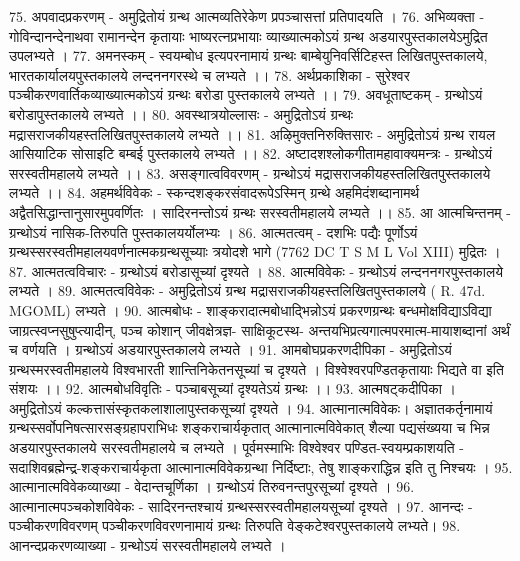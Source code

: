 75. अपवादप्रकरणम् - अमुद्रितोयं ग्रन्थ आत्मव्यतिरेकेण प्रपञ्चासत्तां प्रतिपादयति । 
76. अभिव्यक्ता - गोविन्दानन्देनाथवा रामानन्देन कृतायाः भाष्यरत्नप्रभायाः व्याख्यात्मकोऽयं ग्रन्थ अडयारपुस्तकालयेऽमुद्रित उपलभ्यते । 
77. अमनस्कम् - स्वयम्बोध इत्यपरनामायं ग्रन्थः बाम्बेयुनिवर्सिटिहस्त लिखितपुस्तकालये, भारतकार्यालयपुस्तकालये लन्दननगरस्थे च लभ्यते ।। 
78. अर्थप्रकाशिका - सुरेश्वर पञ्चीकरणवार्तिकव्याख्यात्मकोऽयं ग्रन्थः बरोडा पुस्तकालये लभ्यते ।। 
79. अवधूताष्टकम् - ग्रन्थोऽयं बरोडापुस्तकालये लभ्यते ।। 
80. अवस्थात्रयोल्लासः - अमुद्रितोऽयं ग्रन्थः मद्रासराजकीयहस्तलिखितपुस्तकालये लभ्यते ।। 
81. अऴिमुक्तनिरुक्तिसारः - अमुद्रितोऽयं ग्रन्थ रायल आसियाटिक सोसाइटि बम्बई पुस्तकालये लभ्यते ।। 
82. अष्टादशश्लोकगीतामहावाक्यमन्त्रः - ग्रन्थोऽयं सरस्वतीमहालये लभ्यते ।।
83. असङ्गात्वविवरणम् - ग्रन्थोऽयं मद्रासराजकीयहस्तलिखितपुस्तकालये लभ्यते ।। 
84. अहमर्थविवेकः - स्कन्दशङ्करसंवादरूपेऽस्मिन् ग्रन्थे अहमिदंशब्दानामर्थ अद्वैतसिद्धान्तानुसारमुपवर्णितः । सादिरनन्तोऽयं ग्रन्थः सरस्वतीमहालये लभ्यते ।। 
85. आ आत्मचिन्तनम् - ग्रन्थोऽयं नासिक-तिरुपति पुस्तकालयर्योलभ्यः ।  
86. आत्मतत्वम् - दशभिः पद्यैः पूर्णोऽयं ग्रन्थस्सरस्वतीमहालयवर्णनात्मकग्रन्थसूच्याः त्रयोदशे भागे (7762 DC T S M L Vol XIII) मुद्रितः । 
87. आत्मतत्वविचारः - ग्रन्थोऽयं बरोडासूच्यां दृश्यते । 
88. आत्मविवेकः - ग्रन्थोऽयं लन्दननगरपुस्तकालये लभ्यते । 
89. आत्मतत्वविवेकः - अमुद्रितोऽयं ग्रन्थ मद्रासराजकीयहस्तलिखितपुस्तकालये ( R. 47d. MGOML) लभ्यते । 
90. आत्मबोधः - शाङ्करादात्मबोधाद्भिन्नोऽयं प्रकरणग्रन्थः बन्धमोक्षविद्याऽविद्या जाग्रत्स्वप्नसुषुप्त्यादीन्, पञ्च कोशान् जीवक्षेत्रज्ञ- साक्षिकूटस्थ- अन्तयभिप्रत्यगात्मपरमात्म-मायाशब्दानां अर्थं च वर्णयति । ग्रन्थोऽयं अडयारपुस्तकालये लभ्यते । 
91. आमबोघप्रकरणदीपिका - अमुद्रितोऽयं ग्रन्थस्मरस्वतीमहालये विश्वभारती शान्तिनिकेतनसूच्यां च दृश्यते । विश्वेश्वरपण्डितकृतायाः भिद्यते वा इति संशयः ।। 
92. आत्मबोधविवृतिः - पञ्चाबसूच्यां दृश्यतेऽयं ग्रन्थः ।। 
93. आत्मषट्कदीपिका । अमुद्रितोऽयं कल्कत्तासंस्कृतकलाशालापुस्तकसूच्यां दृश्यते । 
94. आत्मानात्मविवेकः। अज्ञातकर्तृनामायं ग्रन्थस्सर्वोपनिषत्सारसङ्ग्रहापराभिधः शङ्कराचार्यकृतात् आत्मानात्मविवेकात् शैल्या पद्यसंख्यया च भिन्न अडयारपुस्तकालये सरस्वतीमहालये च लभ्यते । पूर्वमस्माभिः विश्वेश्वर पण्डित-स्वयम्प्रकाशयति - सदाशिवब्रह्मेन्द्र-शङ्कराचार्यकृता आत्मानात्मविवेकग्रन्था निर्दिष्टाः, तेषु शाङ्कराद्धिन्न इति तु निश्चयः । 
95. आत्मानात्मविवेकव्याख्या - वेदान्तचूर्णिका । ग्रन्थोऽयं तिरुवनन्तपुरसूच्यां दृश्यते । 
96. आत्मानात्मपञ्चकोशविवेकः - सादिरनन्तश्चायं ग्रन्थस्सरस्वतीमहालयसूच्यां दृश्यते । 
97. आनन्दः - पञ्चीकरणविवरणम् पञ्चीकरणविवरणनामायं ग्रन्थः तिरुपति वेङ्कटेश्वरपुस्तकालये लभ्यते। 
98. आनन्दप्रकरणव्याख्या - ग्रन्थोऽयं सरस्वतीमहालये लभ्यते । 
